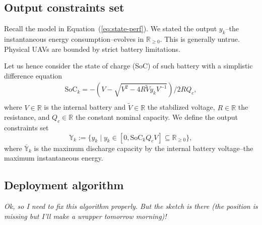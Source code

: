 \documentclass[letterpaper,10pt,conference]{ieeeconf}
\theoremstyle{definition}
\begin{document}


\subsection{Output constraints set}

Recall the model in Equation~(\ref{eq:state-perf}). We stated the output $y_k$--the instantaneous energy consumption--evolves in $\mathbb{R}_{\geq 0}$. This is generally untrue. Physical UAVs are bounded by strict battery limitations.

Let us hence consider the state of charge (SoC) of such battery with a simplistic difference equation~\cite{seewald2020mechanical}
\begin{equation}\begin{split}
  \mathrm{SoC}_k=-\left(V-
  \sqrt{
    V^2-
    4R\tilde{V}y_kV^{-1}}
  \right)/2RQ_c,\\ 
\end{split}\end{equation}
where $V\in\mathbb{R}$ is the internal battery and $\tilde{V}\in\mathbb{R}$ the stabilized voltage, $R\in\mathbb{R}$ the resistance, and $Q_c\in\mathbb{R}$ the constant nominal capacity. We define the output constraints set
\begin{equation}
  \mathbb{Y}_k:=\{y_k\mid y_k\in[0,\mathrm{SoC}_kQ_cV]\subseteq{\mathbb{R}_{\geq 0}}\},
\end{equation}
where $\overline{\mathbb{Y}}_k$ is the maximum discharge capacity by the internal battery voltage--the maximum instantaneous energy.
\subsection{Deployment algorithm}

\begin{center}\textit{Ok, so I need to fix this algorithm properly. But the sketch is there (the position is missing but I'll make a wrapper tomorrow morning)!}\end{center}
\end{document}
